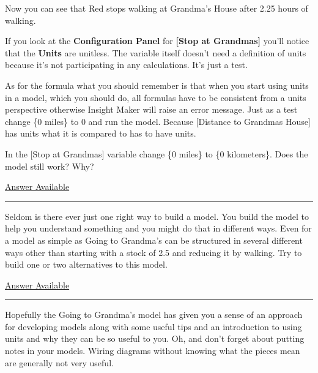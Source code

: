 \documentclass[]{memoir}
\newcommand{\p}[1]{\textbf{{[}#1{]}}}
\renewcommand{\u}[1]{\textbf{#1}}
\renewcommand{\a}[1]{\textbf{#1}}
\begin{document}
\begin{oframed}
\begin{enumerate}
Now you can see that Red stops walking at Grandma's House after 2.25 hours of walking.



\end{enumerate} \end{oframed}

If you look at the \u{Configuration Panel} for \p{Stop at Grandmas}
you'll notice that the \a{Units} are unitless. The variable itself
doesn't need a definition of units because it's not participating in any
calculations. It's just a test.

As for the formula what you should remember is that when you start using
units in a model, which you should do, all formulas have to be
consistent from a units perspective otherwise Insight Maker will raise
an error message. Just as a test change \{0 miles\} to 0 and run the
model. Because {[}Distance to Grandmas House{]} has units what it is
compared to has to have units.


In the {[}Stop at Grandmas{]} variable change \{0 miles\} to \{0
kilometers\}. Does the model still work? Why?

\hyperref[Ans-4-2]{Answer Available}

\begin{center}\rule{3in}{0.4pt}\end{center}


Seldom is there ever just one right way to build a model. You build the
model to help you understand something and you might do that in
different ways. Even for a model as simple as Going to Grandma's can be
structured in several different ways other than starting with a stock of
2.5 and reducing it by walking. Try to build one or two alternatives to
this model.

\hyperref[Ans-4-3]{Answer Available}

\begin{center}\rule{3in}{0.4pt}\end{center}

Hopefully the Going to Grandma's model has given you a sense of an
approach for developing models along with some useful tips and an
introduction to using units and why they can be so useful to you. Oh,
and don't forget about putting notes in your models. Wiring diagrams
without knowing what the pieces mean are generally not very useful.
\end{document}
